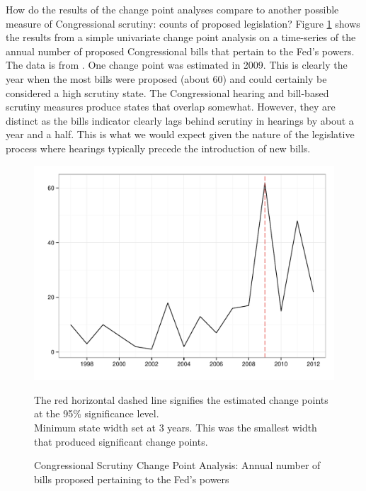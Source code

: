 \documentclass[a4paper]{article}\usepackage[]{graphicx}\usepackage[]{color}
\newenvironment{knitrout}{}{} %
\begin{document}
How do the results of the change point analyses compare to another possible measure of Congressional scrutiny: counts of proposed legislation? Figure \ref{fig:BillsCompare} shows the results from a simple univariate change point analysis on a time-series of the annual number of proposed Congressional bills that pertain to the Fed's powers. The data is from \cite{Binder2014}. One change point was estimated in 2009. This is clearly the year when the most bills were proposed (about 60) and could certainly be considered a high scrutiny state. The Congressional hearing and bill-based scrutiny measures produce states that overlap somewhat. However, they are distinct as the bills indicator clearly lags behind scrutiny in hearings by about a year and a half. This is what we would expect given the nature of the legislative process where hearings typically precede the introduction of new bills.

\begin{figure}
    \caption{Congressional Scrutiny Change Point Analysis: Annual number of bills proposed pertaining to the Fed's powers}
    \label{fig:BillsCompare}
\begin{knitrout}
\color{fgcolor}

{\centering \includegraphics[width=0.8\linewidth]{figure/ScrutinyBills} 

}



\end{knitrout}
{\scriptsize{The red horizontal dashed line signifies the estimated change points at the 95\% significance level.\\
Minimum state width set at 3 years. This was the smallest width that produced significant change points.}}
\end{figure}
\end{document}
